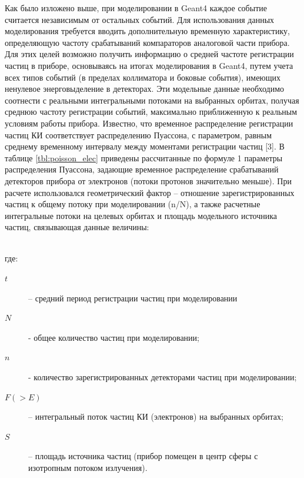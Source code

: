 Как было изложено выше, при моделировании в Geant4 каждое событие считается независимым от остальных событий. Для использования данных моделирования требуется вводить дополнительную временную характеристику, определяющую частоту срабатываний компараторов аналоговой части прибора. Для этих целей возможно получить информацию о средней частоте регистрации частиц в приборе, основываясь на итогах моделирования в Geant4, путем учета всех типов событий (в пределах коллиматора и боковые события), имеющих ненулевое энерговыделение в детекторах. Эти модельные данные необходимо соотнести с реальными интегральными потоками на выбранных орбитах, получая среднюю частоту регистрации событий, максимально приближенную к реальным условиям работы прибора.
Известно, что временное распределение регистрации частиц КИ соответствует распределению Пуассона, с параметром, равным среднему временному интервалу между моментами регистрации частиц [3].
В таблице \ref{tbl:poisson_elec} приведены рассчитанные по формуле 1 параметры распределения Пуассона, задающие временное распределение срабатываний детекторов прибора от электронов (потоки протонов значительно меньше). При расчете использовался геометрический фактор – отношение зарегистрированных частиц к общему потоку при моделировании (n/N), а также расчетные интегральные потоки на целевых орбитах и площадь модельного источника частиц, связывающая данные величины:

\\где:
\begin{description}
	\item[$ t $] – средний период регистрации частиц при моделировании

	\item[$ N $] - общее количество частиц при моделировании;

	\item[$ n $] - количество зарегистрированных детекторами частиц при моделировании;

	\item[$ F(>E) $] – интегральный поток частиц КИ (электронов) на выбранных орбитах;

	\item[$ S  $]– площадь источника частиц (прибор помещен в центр сферы с изотропным потоком излучения). 
\end{description} 

